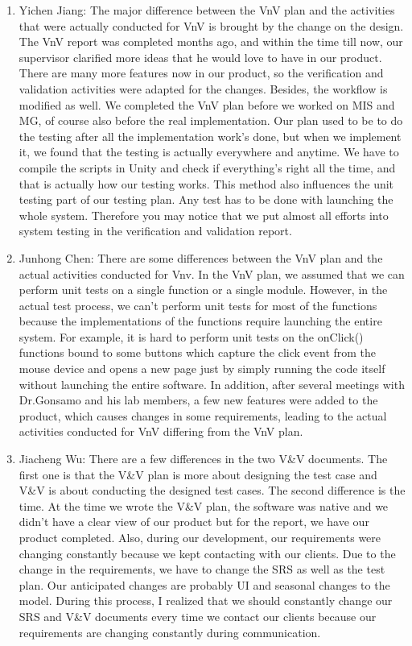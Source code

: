 \documentclass[12pt, titlepage]{article}
\begin{document}
\begin{enumerate}
  \item Yichen Jiang: The major difference between the VnV plan and the activities that were actually conducted for VnV is brought by the change on the design. The VnV report was completed months ago, and within the time till now, our supervisor clarified more ideas that he would love to have in our product. There are many more features now in our product, so the verification and validation activities were adapted for the changes. Besides, the workflow is modified as well. We completed the VnV plan before we worked on MIS and MG, of course also before the real implementation. Our plan used to be to do the testing after all the implementation work's done, but when we implement it, we found that the testing is actually everywhere and anytime. We have to compile the scripts in Unity and check if everything's right all the time, and that is actually how our testing works. This method also influences the unit testing part of our testing plan. Any test has to be done with launching the whole system. Therefore you may notice that we put almost all efforts into system testing in the verification and validation report. 
    \item Junhong Chen: There are some differences between the VnV plan and the actual activities conducted for Vnv. In the VnV plan, we assumed that we can perform unit tests on a single function or a single module. However, in the actual test process, we can't perform unit tests for most of the functions because the implementations of the functions require launching the entire system. For example, it is hard to perform unit tests on the onClick() functions bound to some buttons which capture the click event from the mouse device and opens a new page just by simply running the code itself without launching the entire software. In addition, after several meetings with Dr.Gonsamo and his lab members, a few new features were added to the product, which causes changes in some requirements, leading to the actual activities conducted for VnV differing from the VnV plan.
    \item  Jiacheng Wu: There are a few differences in the two V\&V documents.
     The first one is that the V\&V plan is more about designing the test case and V\&V is about conducting the designed test cases. The second difference is the time. At the time we wrote the V\&V plan, the software was native and we didn't have a clear view of our product but for the report, we have our product completed. Also, during our development, our requirements were changing constantly because we kept contacting with our clients. Due to the change in the requirements, we have to change the SRS as well as the test plan. Our anticipated changes are probably UI and seasonal changes to the model. During this process, I realized that we should constantly change our SRS and V\&V documents every time we contact our clients because our requirements are changing constantly during communication.


\end{enumerate}
\end{document}
